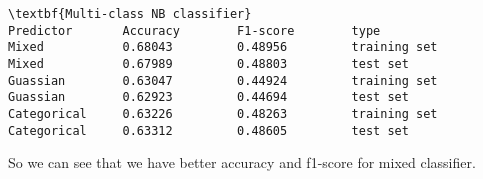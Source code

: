 \documentclass[11pt]{article}
\begin{document}
    \begin{Verbatim}[commandchars=\\\{\}]
\textbf{Multi-class NB classifier}
Predictor       Accuracy        F1-score        type           
Mixed           0.68043         0.48956         training set   
Mixed           0.67989         0.48803         test set       
Guassian        0.63047         0.44924         training set   
Guassian        0.62923         0.44694         test set       
Categorical     0.63226         0.48263         training set   
Categorical     0.63312         0.48605         test set       

    \end{Verbatim}

    So we can see that we have better accuracy and f1-score for mixed
classifier.


    
    
    
    
\end{document}
